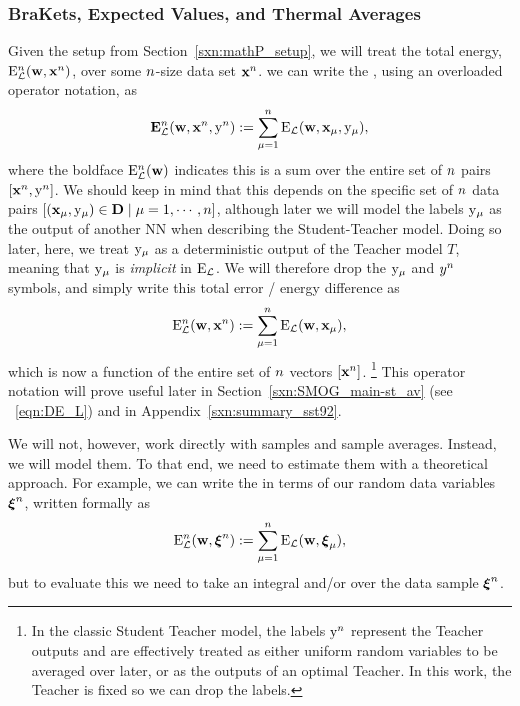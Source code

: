 \subsubsection{BraKets, Expected Values, and Thermal Averages}
\label{sxn:mathP_averages}
Given the setup from Section~\ref{sxn:mathP_setup},
we will treat the total energy, $\mathbf{\mathrm{E}}^{n}_{\mathcal{L}}(\mathbf{w}, \mathbf{x}^{n})$, over some $n$-size data set $\mathbf{x}^{n}$.
we can write the \TotalDataSampleError,
using an overloaded operator notation, as
\begin{align}
  \label{eqn:detopxy}
  \mathbf{{E}}^{n}_{\mathcal{L}}(\mathbf{w}, \mathbf{x}^{n}, \mathrm{y}^{n}) :=\sum_{\mu=1}^{n}\mathrm{E}_{\mathcal{L}}({\mathbf{w}},{\mathbf{x}}_{\mu}, \mathrm{y}_{\mu})  ,
\end{align}
where the boldface $\mathbf{\mathrm{E}}^{n}_{\mathcal{L}}(\mathbf{w})$ indicates this is a sum over the entire set of $n$ pairs $[\mathbf{x}^{n}, \mathrm{y}^{n}]$.
 We should keep in mind that this depends on the specific set of $n$ data pairs $[({\mathbf{x}}_{\mu},\mathrm{y}_{\mu})\in\mathbf{D}\;|\;\mu=1,\cdots,n]$, 
 although later we will model the labels $\mathrm{y}_{\mu}$ as the output of another NN when describing the Student-Teacher model.
Doing so later, here, we treat $\mathrm{y}_{\mu}$ as a deterministic output of the Teacher model $T$, meaning that
$\mathrm{y}_{\mu}$ is \emph{implicit} in $\mathrm{E}_{\mathcal{L}}$.
We will therefore drop the $\mathrm{y}_{\mu}$ and $y^{n}$ symbols, 
and simply write this total error / energy difference as
\begin{align}
  \label{eqn:detox_FIXLATER}
  \mathbf{\mathrm{E}}^{n}_{\mathcal{L}}(\mathbf{w}, \mathbf{x}^{n}) :=\sum_{\mu=1}^{n}\mathrm{E}_{\mathcal{L}}({\mathbf{w}},{\mathbf{x}}_{\mu})  ,
\end{align}
which is now a function of the entire set of $n$ vectors $[\mathbf{x}^{n}]$.%
\footnote{In the classic Student Teacher model, the labels  $\mathrm{y}^{n}$ represent the Teacher outputs and are effectively treated as either uniform random variables to be averaged over later, or as the outputs of an optimal Teacher. In this work, the Teacher is fixed so we can drop the labels.}
This operator notation will prove useful later in Section~\ref{sxn:SMOG_main-st_av}
(see \EQN~\ref{eqn:DE_L}) and in Appendix~\ref{sxn:summary_sst92}.

We will not, however, work directly with samples and sample averages.
Instead, we will model them.
To that end, we need to estimate them with a theoretical approach. For example, we can write the \TotalDataSampleError 
in terms of our random data variables $\boldsymbol{\xi}^{n}$, written formally as
\begin{align}
\label{eqn:tdse}
\mathbf{\mathrm{E}}^{n}_{\mathcal{L}}(\mathbf{w}, \boldsymbol{\xi}^{n}) := \sum_{\mu=1}^{n}\mathrm{E}_{\mathcal{L}}(\mathbf{w},\boldsymbol{\xi}_{\mu}) ,
\end{align}
but to evaluate this we need to take an integral and/or \ExpectedValue over the data sample $\boldsymbol{\xi}^{n}$.

